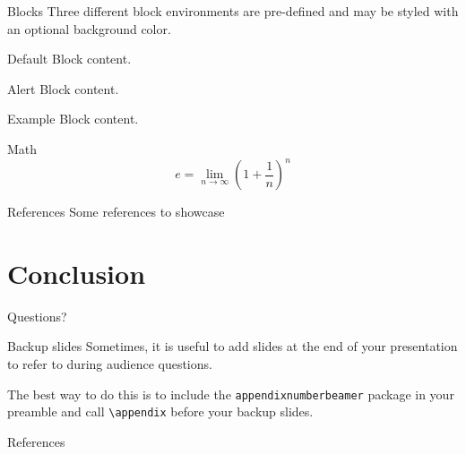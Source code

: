 \documentclass[10pt,xcolor={dvipsnames,svgnames,x11names}]{beamer}
\begin{document}
\begin{frame}{Blocks}
  Three different block environments are pre-defined and may be styled with an
  optional background color.

      \begin{block}{Default}
        Block content.
      \end{block}

      \begin{alertblock}{Alert}
        Block content.
      \end{alertblock}

      \begin{exampleblock}{Example}
        Block content.
      \end{exampleblock}
      
\end{frame}
\begin{frame}{Math}
  \begin{equation*}
    e = \lim_{n\to \infty} \left(1 + \frac{1}{n}\right)^n
  \end{equation*}
\end{frame}

\begin{frame}{References}
  Some references to showcase \cite{kim2015coordination,carli2020energy}
\end{frame}

\section{Conclusion}


{
\begin{frame}[standout]
  Questions?
\end{frame}
}

\appendix

\begin{frame}[fragile]{Backup slides}
  Sometimes, it is useful to add slides at the end of your presentation to
  refer to during audience questions.

  The best way to do this is to include the \verb|appendixnumberbeamer|
  package in your preamble and call \verb|\appendix| before your backup slides.

\end{frame}

\begin{frame}[allowframebreaks]{References}

  
  
\end{frame}
\end{document}
